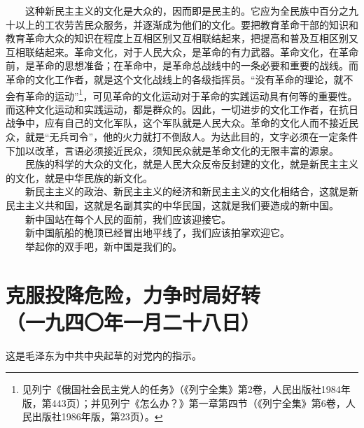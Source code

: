 \documentclass[cn,11pt,chinese]{elegantbook}
\def\myformat#1{\hfil\hfil #1}
\begin{document}
　　这种新民主主义的文化是大众的，因而即是民主的。它应为全民族中百分之九十以上的工农劳苦民众服务，并逐渐成为他们的文化。要把教育革命干部的知识和教育革命大众的知识在程度上互相区别又互相联结起来，把提高和普及互相区别又互相联结起来。革命文化，对于人民大众，是革命的有力武器。革命文化，在革命前，是革命的思想准备；在革命中，是革命总战线中的一条必要和重要的战线。而革命的文化工作者，就是这个文化战线上的各级指挥员。“没有革命的理论，就不会有革命的运动”\footnote[34]{ 见列宁《俄国社会民主党人的任务》（《列宁全集》第2卷，人民出版社1984年版，第443页）；并见列宁《怎么办？》第一章第四节（《列宁全集》第6卷，人民出版社1986年版，第23页）。}，可见革命的文化运动对于革命的实践运动具有何等的重要性。而这种文化运动和实践运动，都是群众的。因此，一切进步的文化工作者，在抗日战争中，应有自己的文化军队，这个军队就是人民大众。革命的文化人而不接近民众，就是“无兵司令”，他的火力就打不倒敌人。为达此目的，文字必须在一定条件下加以改革，言语必须接近民众，须知民众就是革命文化的无限丰富的源泉。\\
　　民族的科学的大众的文化，就是人民大众反帝反封建的文化，就是新民主主义的文化，就是中华民族的新文化。\\
　　新民主主义的政治、新民主主义的经济和新民主主义的文化相结合，这就是新民主主义共和国，这就是名副其实的中华民国，这就是我们要造成的新中国。\\
　　新中国站在每个人民的面前，我们应该迎接它。\\
　　新中国航船的桅顶已经冒出地平线了，我们应该拍掌欢迎它。\\
　　举起你的双手吧，新中国是我们的。\\
\newpage\section*{\myformat{克服投降危险，力争时局好转}\\\myformat{（一九四〇年一月二十八日）}}
\begin{introduction}\item  这是毛泽东为中共中央起草的对党内的指示。\end{introduction}
\end{document}
